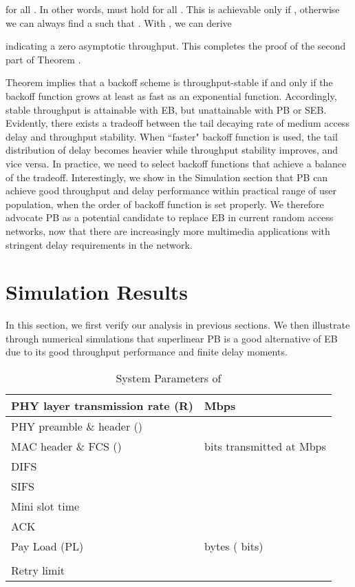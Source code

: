 \documentclass[journal]{IEEEtran}
\begin{document}
for all . In other words,  must hold for all . This is achievable only if , otherwise we can always find a  such that . With , we can derive

indicating a zero asymptotic throughput. This completes the proof of the second part of Theorem . 

Theorem  implies that a backoff scheme is throughput-stable if and only if the backoff function grows at least as fast as an exponential function. Accordingly, stable throughput is attainable with EB, but unattainable with PB or SEB. Evidently, there exists a tradeoff between the tail decaying rate of medium access delay and throughput stability. When ``faster" backoff function is used, the tail distribution of delay becomes heavier while throughput stability improves, and vice versa. In practice, we need to select backoff functions that achieve a balance of the tradeoff. Interestingly, we show in the Simulation section that PB can achieve good throughput and delay performance within practical range of user population, when the order of backoff function is set properly. We therefore advocate PB as a potential candidate to replace EB in current random access networks, now that there are increasingly more multimedia applications with stringent delay requirements in the network.

\section{Simulation Results}
In this section, we first verify our analysis in previous sections. We then illustrate through numerical simulations that superlinear PB is a good alternative of EB due to its good throughput performance and finite delay moments.

\begin{table}
\footnotesize
\caption{System Parameters of }
\begin{center}
\begin{tabular}{|l|l|}
\hline
 PHY layer transmission rate (R)          &    Mbps    \\ \hline
 PHY preamble \& header  ()          &      \\ \hline
 MAC header \& FCS    ()             &    bits transmitted at  Mbps    \\ \hline
 DIFS                                     &        \\ \hline
 SIFS                                     &        \\ \hline
 Mini slot time                   &        \\ \hline
 ACK                                      &               \\ \hline
 Pay Load (PL)                            &    bytes ( bits)  \\ \hline
                                     &               \\ \hline
 Retry limit                              &              \\ \hline
\end{tabular}
\end{center}
\end{table}
\end{document}

